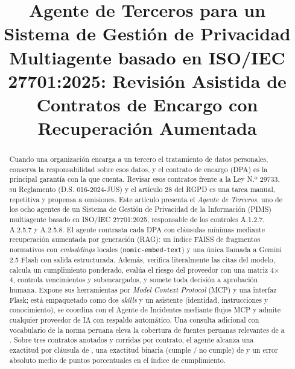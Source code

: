 \documentclass[conference]{IEEEtran}
\begin{document}
\title{Agente de Terceros para un Sistema de Gestión de Privacidad Multiagente basado en ISO/IEC 27701:2025: Revisión Asistida de Contratos de Encargo con Recuperación Aumentada}

\author{
}

\maketitle

\begin{abstract}
Cuando una organización encarga a un tercero el tratamiento de datos personales, conserva la responsabilidad sobre esos datos, y el contrato de encargo (DPA) es la principal garantía con la que cuenta. Revisar esos contratos frente a la Ley N.º 29733, su Reglamento (D.S. 016-2024-JUS) y el artículo 28 del RGPD es una tarea manual, repetitiva y propensa a omisiones. Este artículo presenta el \emph{Agente de Terceros}, uno de los ocho agentes de un Sistema de Gestión de Privacidad de la Información (PIMS) multiagente basado en ISO/IEC 27701:2025, responsable de los controles A.1.2.7, A.2.5.7 y A.2.5.8. El agente contrasta cada DPA con \NumClausulas{} cláusulas mínimas mediante recuperación aumentada por generación (RAG): un índice FAISS de \NumFragmentos{} fragmentos normativos con \emph{embeddings} locales (\texttt{nomic-embed-text}) y una única llamada a Gemini 2.5 Flash con salida estructurada. Además, verifica literalmente las citas del modelo, calcula un cumplimiento ponderado, evalúa el riesgo del proveedor con una matriz 4$\times$4, controla vencimientos y subencargados, y somete toda decisión a aprobación humana. Expone sus herramientas por \emph{Model Context Protocol} (MCP) y una interfaz Flask; está empaquetado como dos \emph{skills} y un asistente (identidad, instrucciones y conocimiento), se coordina con el Agente de Incidentes mediante flujos MCP y admite cualquier proveedor de IA con respaldo automático. Una consulta adicional con vocabulario de la norma peruana eleva la cobertura de fuentes peruanas relevantes de \PeruGen{} a \PeruMix{}. Sobre tres contratos anotados y \Corridas{} corridas por contrato, el agente alcanza una exactitud por cláusula de \Exactitud{}, una exactitud binaria (cumple / no cumple) de \ExactitudBin{} y un error absoluto medio de \MaePct{} puntos porcentuales en el índice de cumplimiento.
\end{abstract}
\end{document}
